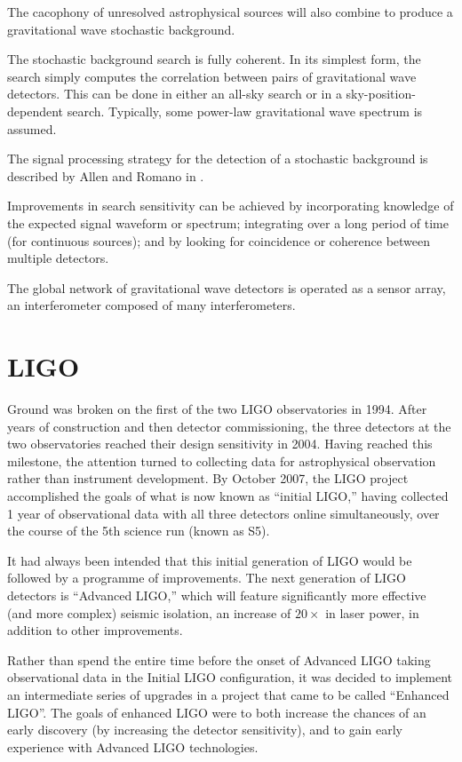 \begin{itemize}
  The cacophony of unresolved astrophysical sources will also combine
  to produce a gravitational wave stochastic background.   

  The stochastic background search is fully coherent.  In its simplest
  form, the search simply computes the correlation between pairs of
  gravitational wave detectors.  This can be done in either an all-sky
  search or in a sky-position-dependent search.  Typically, some
  power-law gravitational wave spectrum is assumed.
  
  The signal processing strategy for the detection of a stochastic background
  is described by Allen and Romano in \cite{Allen1999Detecting}.
\end{itemize}

Improvements in search sensitivity can be achieved by incorporating
knowledge of the expected signal waveform or spectrum; integrating
over a long period of time (for continuous sources); and by looking
for coincidence or coherence between multiple detectors.

The global network of gravitational wave detectors is operated as a
sensor array, an interferometer composed of many interferometers.

\section{LIGO}

Ground was broken on the first of the two LIGO observatories in 1994.
After years of construction and then detector commissioning, the three
detectors at the two observatories reached their design sensitivity\cite{LigoSRD} in
2004\cite{Ballmer2006LIGO}.  Having reached this milestone, the attention turned to
collecting data for astrophysical observation rather than instrument
development.  By October 2007, the LIGO project accomplished the goals
of what is now known as ``initial LIGO,'' having collected 1 year of
observational data with all three detectors online simultaneously, over
the course of the 5th science run (known as S5).

It had always been intended that this initial generation of LIGO would
be followed by a programme of improvements\cite{Abramovici1992LIGO}.  The next generation of
LIGO detectors is ``Advanced LIGO,'' which will feature significantly
more effective (and more complex) seismic isolation, an increase of
$20\times$ in laser power, in addition to other improvements.

Rather than spend the entire time before the onset of Advanced LIGO
taking observational data in the Initial LIGO configuration, it was
decided to implement an intermediate series of upgrades in a project
that came to be called ``Enhanced
LIGO''\cite{Adhikari2006Enhanced,T050252,JoshSmithEnhancedAdvanced}.
The goals of enhanced LIGO were to both increase the chances of an
early discovery (by increasing the detector sensitivity), and to gain
early experience with Advanced LIGO technologies.

